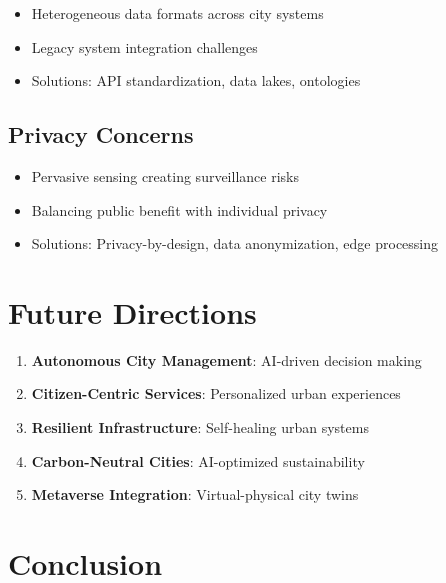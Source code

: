 \documentclass[12pt,a4paper]{article}
\begin{document}
\begin{itemize}
    \item Heterogeneous data formats across city systems
    \item Legacy system integration challenges
    \item Solutions: API standardization, data lakes, ontologies
\end{itemize}

\subsection{Privacy Concerns}

\begin{itemize}
    \item Pervasive sensing creating surveillance risks
    \item Balancing public benefit with individual privacy
    \item Solutions: Privacy-by-design, data anonymization, edge processing
\end{itemize}

\section{Future Directions}

\begin{enumerate}
    \item \textbf{Autonomous City Management}: AI-driven decision making
    \item \textbf{Citizen-Centric Services}: Personalized urban experiences
    \item \textbf{Resilient Infrastructure}: Self-healing urban systems
    \item \textbf{Carbon-Neutral Cities}: AI-optimized sustainability
    \item \textbf{Metaverse Integration}: Virtual-physical city twins
\end{enumerate}

\section{Conclusion}
\end{document}
